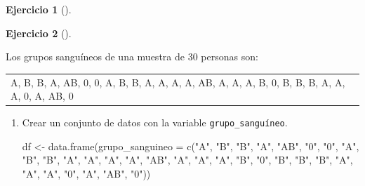 \documentclass[
  a4paper,
]{scrreport}
\newenvironment{Shaded}{\begin{snugshade}}{\end{snugshade}}
\newcommand{\AttributeTok}[1]{\textcolor[rgb]{0.40,0.45,0.13}{#1}}
\newcommand{\FunctionTok}[1]{\textcolor[rgb]{0.28,0.35,0.67}{#1}}
\newcommand{\NormalTok}[1]{\textcolor[rgb]{0.00,0.23,0.31}{#1}}
\newcommand{\OtherTok}[1]{\textcolor[rgb]{0.00,0.23,0.31}{#1}}
\newcommand{\StringTok}[1]{\textcolor[rgb]{0.13,0.47,0.30}{#1}}
\theoremstyle{definition}
\newtheorem{exercise}{Ejercicio}[chapter]
\theoremstyle{remark}
\begin{document}
\begin{exercise}[]
\begin{enumerate}
\begin{tcolorbox}
  \end{tcolorbox}
\end{enumerate}

\end{exercise}

\begin{exercise}[]\protect\hypertarget{exr-frecuencias-graficos-3}{}\label{exr-frecuencias-graficos-3}

Los grupos sanguíneos de una muestra de 30 personas son:

\begin{longtable}[]{@{}
  >{\centering\arraybackslash}p{}@{}}
\toprule\noalign{}
\endhead
\bottomrule\noalign{}
\endlastfoot
A, B, B, A, AB, 0, 0, A, B, B, A, A, A, A, AB, A, A, A, B, 0, B, B, B,
A, A, A, 0, A, AB, 0 \\
\end{longtable}

\begin{enumerate}
\def\labelenumi{\alph{enumi}.}
\item
  Crear un conjunto de datos con la variable \texttt{grupo\_sanguíneo}.

  \begin{tcolorbox}[enhanced jigsaw, breakable, toptitle=1mm, colbacktitle=quarto-callout-tip-color!10!white, rightrule=.15mm, opacityback=0, opacitybacktitle=0.6, titlerule=0mm, coltitle=black, colframe=quarto-callout-tip-color-frame, colback=white, bottomtitle=1mm, leftrule=.75mm, toprule=.15mm, title=\textcolor{quarto-callout-tip-color}{\faLightbulb}\hspace{0.5em}{Solución}, arc=.35mm, bottomrule=.15mm, left=2mm]

\begin{Shaded}
\begin{Highlighting}[]
\NormalTok{df }\OtherTok{\textless{}{-}} \FunctionTok{data.frame}\NormalTok{(}\AttributeTok{grupo\_sanguineo =} \FunctionTok{c}\NormalTok{(}\StringTok{"A"}\NormalTok{, }\StringTok{"B"}\NormalTok{, }\StringTok{"B"}\NormalTok{, }\StringTok{"A"}\NormalTok{, }\StringTok{"AB"}\NormalTok{, }\StringTok{"0"}\NormalTok{, }\StringTok{"0"}\NormalTok{, }\StringTok{"A"}\NormalTok{, }\StringTok{"B"}\NormalTok{, }\StringTok{"B"}\NormalTok{, }\StringTok{"A"}\NormalTok{, }\StringTok{"A"}\NormalTok{, }\StringTok{"A"}\NormalTok{, }\StringTok{"A"}\NormalTok{, }\StringTok{"AB"}\NormalTok{, }\StringTok{"A"}\NormalTok{, }\StringTok{"A"}\NormalTok{, }\StringTok{"A"}\NormalTok{, }\StringTok{"B"}\NormalTok{, }\StringTok{"0"}\NormalTok{, }\StringTok{"B"}\NormalTok{, }\StringTok{"B"}\NormalTok{, }\StringTok{"B"}\NormalTok{, }\StringTok{"A"}\NormalTok{, }\StringTok{"A"}\NormalTok{, }\StringTok{"A"}\NormalTok{, }\StringTok{"0"}\NormalTok{, }\StringTok{"A"}\NormalTok{, }\StringTok{"AB"}\NormalTok{, }\StringTok{"0"}\NormalTok{))}
\end{Highlighting}
\end{Shaded}


\end{tcolorbox}
\end{enumerate}
\end{exercise}
\end{document}
